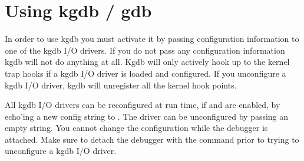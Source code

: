 \documentclass[a4paper,8pt,english]{sphinxmanual}
\begin{document}
\section{Using kgdb / gdb}
\label{dev-tools/kgdb:using-kgdb-gdb}
In order to use kgdb you must activate it by passing configuration
information to one of the kgdb I/O drivers. If you do not pass any
configuration information kgdb will not do anything at all. Kgdb will
only actively hook up to the kernel trap hooks if a kgdb I/O driver is
loaded and configured. If you unconfigure a kgdb I/O driver, kgdb will
unregister all the kernel hook points.

All kgdb I/O drivers can be reconfigured at run time, if
 and  are enabled, by echo'ing a new
config string to . The driver
can be unconfigured by passing an empty string. You cannot change the
configuration while the debugger is attached. Make sure to detach the
debugger with the  command prior to trying to unconfigure a
kgdb I/O driver.
\end{document}
